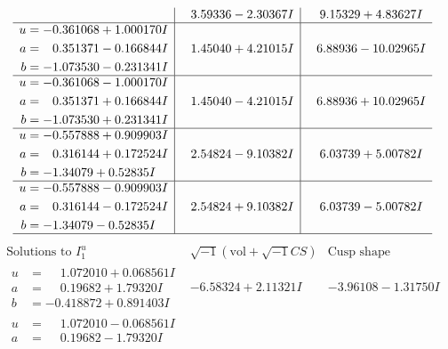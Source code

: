 \documentclass[1p]{elsarticle_modified}
\theoremstyle{definition}
\newcommand{\I}{\sqrt{-1}}
\begin{document}
$$\begin{array}{c|c|c}
 & \phantom{-}3.59336 - 2.30367 I & \phantom{-}9.15329 + 4.83627 I \\ \hline\begin{aligned}
u &= -0.361068 + 1.000170 I \\
a &= \phantom{-}0.351371 - 0.166844 I \\
b &= -1.073530 - 0.231341 I\end{aligned}
 & \phantom{-}1.45040 + 4.21015 I & \phantom{-}6.88936 - 10.02965 I \\ \hline\begin{aligned}
u &= -0.361068 - 1.000170 I \\
a &= \phantom{-}0.351371 + 0.166844 I \\
b &= -1.073530 + 0.231341 I\end{aligned}
 & \phantom{-}1.45040 - 4.21015 I & \phantom{-}6.88936 + 10.02965 I \\ \hline\begin{aligned}
u &= -0.557888 + 0.909903 I \\
a &= \phantom{-}0.316144 + 0.172524 I \\
b &= -1.34079 + 0.52835 I\end{aligned}
 & \phantom{-}2.54824 - 9.10382 I & \phantom{-}6.03739 + 5.00782 I \\ \hline\begin{aligned}
u &= -0.557888 - 0.909903 I \\
a &= \phantom{-}0.316144 - 0.172524 I \\
b &= -1.34079 - 0.52835 I\end{aligned}
 & \phantom{-}2.54824 + 9.10382 I & \phantom{-}6.03739 - 5.00782 I\\
 \hline 
 \end{array}$$\newpage$$\begin{array}{c|c|c}  
\text{Solutions to }I^u_{1}& \I (\text{vol} + \sqrt{-1}CS) & \text{Cusp shape}\\
 \hline 
\begin{aligned}
u &= \phantom{-}1.072010 + 0.068561 I \\
a &= \phantom{-}0.19682 + 1.79320 I \\
b &= -0.418872 + 0.891403 I\end{aligned}
 & -6.58324 + 2.11321 I & -3.96108 - 1.31750 I \\ \hline\begin{aligned}
u &= \phantom{-}1.072010 - 0.068561 I \\
a &= \phantom{-}0.19682 - 1.79320 I \\

\end{aligned}
\end{array}$$
\end{document}
